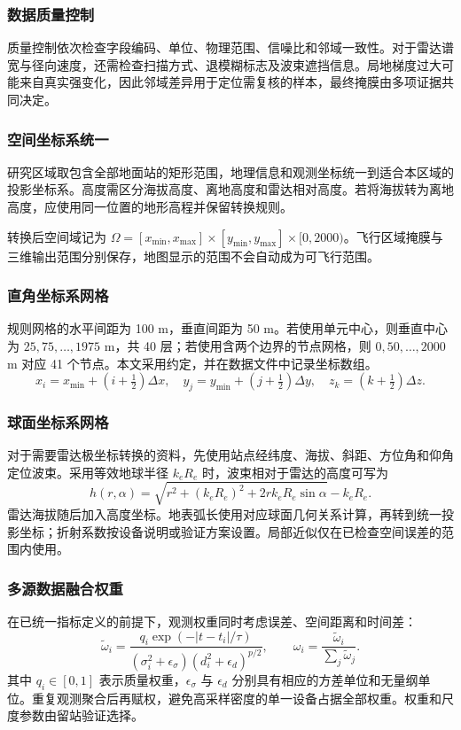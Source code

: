 \subsubsection{数据质量控制}
质量控制依次检查字段编码、单位、物理范围、信噪比和邻域一致性。对于雷达谱宽与径向速度，还需检查扫描方式、退模糊标志及波束遮挡信息。局地梯度过大可能来自真实强变化，因此邻域差异用于定位需复核的样本，最终掩膜由多项证据共同决定。
\subsubsection{空间坐标系统一}
研究区域取包含全部地面站的矩形范围，地理信息和观测坐标统一到适合本区域的投影坐标系。高度需区分海拔高度、离地高度和雷达相对高度。若将海拔转为离地高度，应使用同一位置的地形高程并保留转换规则。

转换后空间域记为 $\Omega=[x_{\min},x_{\max}]\times[y_{\min},y_{\max}]\times[0,2000)$。飞行区域掩膜与三维输出范围分别保存，地图显示的范围不会自动成为可飞行范围。
\subsubsection{直角坐标系网格}
规则网格的水平间距为 100 m，垂直间距为 50 m。若使用单元中心，则垂直中心为 $25,75,\ldots,1975$ m，共 40 层；若使用含两个边界的节点网格，则 $0,50,\ldots,2000$ m 对应 41 个节点。本文采用约定，并在数据文件中记录坐标数组。
\begin{equation}
x_i=x_{\min}+(i+\tfrac12)\Delta x,\quad
y_j=y_{\min}+(j+\tfrac12)\Delta y,\quad
z_k=(k+\tfrac12)\Delta z.
\end{equation}
\subsubsection{球面坐标系网格}
对于需要雷达极坐标转换的资料，先使用站点经纬度、海拔、斜距、方位角和仰角定位波束。采用等效地球半径 $k_eR_e$ 时，波束相对于雷达的高度可写为
\begin{equation}
h(r,\alpha)=\sqrt{r^2+(k_eR_e)^2+2rk_eR_e\sin\alpha}-k_eR_e.
\end{equation}
雷达海拔随后加入高度坐标。地表弧长使用对应球面几何关系计算，再转到统一投影坐标；折射系数按设备说明或验证方案设置。局部近似仅在已检查空间误差的范围内使用。
\subsubsection{多源数据融合权重}
在已统一指标定义的前提下，观测权重同时考虑误差、空间距离和时间差：
\begin{equation}\label{eq:weights}
\widetilde\omega_i=\frac{q_i\exp(-|t-t_i|/\tau)}
{(\sigma_i^2+\epsilon_\sigma)(d_i^2+\epsilon_d)^{p/2}},\qquad
\omega_i=\frac{\widetilde\omega_i}{\sum_j\widetilde\omega_j}.
\end{equation}
其中 $q_i\in[0,1]$ 表示质量权重，$\epsilon_\sigma$ 与 $\epsilon_d$ 分别具有相应的方差单位和无量纲单位。重复观测聚合后再赋权，避免高采样密度的单一设备占据全部权重。权重和尺度参数由留站验证选择。
